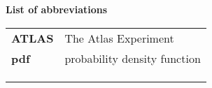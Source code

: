 {\huge\bfseries List of abbreviations}

\vspace{50pt}
\begin{tabular}{ll}
    \textbf{ATLAS} & The Atlas Experiment\\
    \textbf{pdf} & probability density function \\
    \textbf{} & \\
    \textbf{} & \\
    \textbf{} & \\
    
\end{tabular}